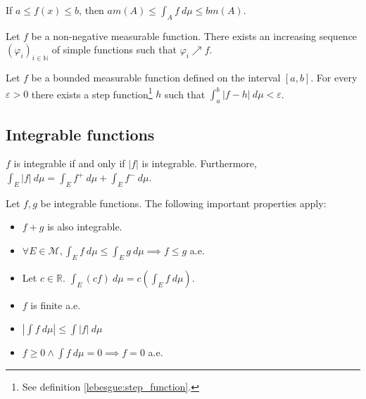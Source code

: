     \begin{theorem}
        If $a\leq f(x)\leq b$, then $am(A)\leq\int_Af\ d\mu\leq bm(A)$.
    \end{theorem}

    \begin{property}
        Let $f$ be a non-negative measurable function. There exists an increasing sequence $(\varphi_i)_{i\in\mathbb{N}}$ of simple functions such that $\varphi_i\nearrow f$.
    \end{property}
    \begin{property}
        Let $f$ be a bounded measurable function defined on the interval $[a,b]$. For every $\varepsilon>0$ there exists a step function\footnote{See definition \ref{lebesgue:step_function}.} $h$ such that $\int_a^b|f-h|\ d\mu<\varepsilon$.
    \end{property}

\subsection{Integrable functions}


    \begin{property}
        $f$ is integrable if and only if $|f|$ is integrable. Furthermore, $\int_E|f|\ d\mu = \int_E f^+\ d\mu + \int_E f^-\ d\mu$.
    \end{property}
    \begin{property}
        Let $f,g$ be integrable functions. The following important properties apply:
        \begin{itemize}
            \item $f+g$ is also integrable.
            \item $\forall E\in\mathcal{M}, \int_Ef\ d\mu\leq\int_Eg\ d\mu\implies f\leq g$ a.e.
            \item Let $c\in\mathbb{R}$. $\int_E(cf)\ d\mu = c(\int_Ef\ d\mu)$.
            \item $f$ is finite a.e.
            \item $|\int f\ d\mu|\leq\int|f|\ d\mu$
            \item $f\geq0\land\int f\ d\mu=0\implies f=0$ a.e.
        \end{itemize}
    \end{property}

